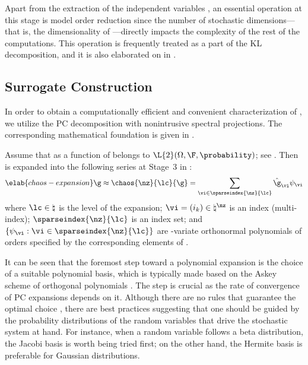 Apart from the extraction of the independent variables \vz, an essential
operation at this stage is model order reduction since the number of stochastic
dimensions---that is, the dimensionality of \vz---directly impacts the
complexity of the rest of the computations. This operation is frequently treated
as a part of the \ac{KL} decomposition, and it is also elaborated on in
.

\subsection{Surrogate Construction}

In order to obtain a computationally efficient and convenient characterization
of \g, we utilize the \ac{PC} decomposition with nonintrusive spectral
projections. The corresponding mathematical foundation is given in
.

Assume that \g as a function of \vz belongs to $\L{2}(\Omega, \F,
\probability)$; see . Then \g is expanded into the
following series at Stage~3 in :
\begin{equation} \elab{chaos-expansion}
  \g \approx \chaos{\nz}{\lc}{\g}
  = \sum_{\vi \in \sparseindex{\nz}{\lc}} \hat{\g}_{\vi} \psi_{\vi}
\end{equation}
where $\lc \in \natural$ is the level of the expansion; $\vi = (i_k) \in
\natural^\nz$ is an index (multi-index); $\sparseindex{\nz}{\lc}$ is an index
set; and $\{ \psi_{\vi}: \vi \in \sparseindex{\nz}{\lc} \}$ are \nz-variate
orthonormal polynomials of orders specified by the corresponding elements of
\vi.

It can be seen that the foremost step toward a polynomial expansion is the
choice of a suitable polynomial basis, which is typically made based on the
Askey scheme of orthogonal polynomials \cite{xiu2010}. The step is crucial as
the rate of convergence of \ac{PC} expansions depends on it. Although there are
no rules that guarantee the optimal choice \cite{knio2006}, there are best
practices suggesting that one should be guided by the probability distributions
of the random variables that drive the stochastic system at hand. For instance,
when a random variable follows a beta distribution, the Jacobi basis is worth
being tried first; on the other hand, the Hermite basis is preferable for
Gaussian distributions.

